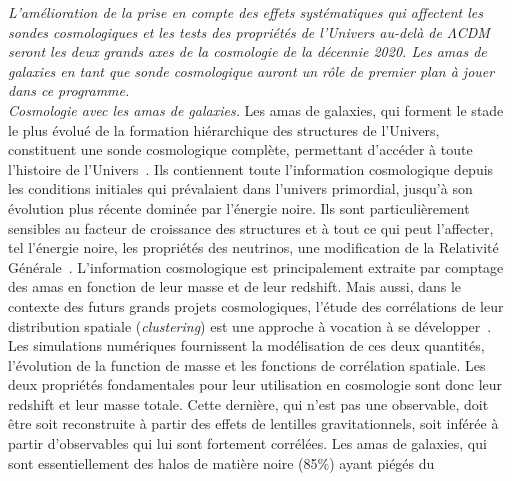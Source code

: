 \emph{L'amélioration de la prise en compte des effets systématiques
qui affectent les sondes cosmologiques et les tests des propriétés de
l'Univers au-delà de $\Lambda$CDM seront les deux grands axes de la
cosmologie de la décennie 2020. Les amas de galaxies en tant que sonde
cosmologique auront un rôle de premier plan à jouer dans ce programme.}\\


\emph{Cosmologie avec les amas de galaxies.}
Les amas de galaxies, qui forment le stade le plus évolué
de la formation hiérarchique des structures de l’Univers, constituent
une sonde cosmologique complète, permettant d’accéder à toute l’histoire de
l’Univers~\citep{Allen2011}. Ils contiennent toute l’information
cosmologique depuis les conditions initiales qui prévalaient dans
l’univers primordial, jusqu'à son évolution plus récente dominée par
l’énergie noire. Ils sont particulièrement sensibles au facteur de
croissance des structures et à tout ce qui peut l’affecter, tel l'énergie
noire, les propriétés des neutrinos, une modification de la Relativité
Générale~\citep{Haiman2001, Wang2005, Bolliet2019, Mohr2003,
Hagstotz2019}.
L’information cosmologique est principalement extraite par comptage
des amas en fonction de leur masse et de leur redshift. Mais aussi,
dans le contexte des futurs grands projets cosmologiques, l’étude des
corrélations de leur distribution spatiale (\emph{clustering}) est une
approche à vocation à se développer~\citep[e.g.][]{Mana2013}. Les
simulations numériques fournissent la modélisation de ces deux
quantités, l'évolution de la function de masse et les fonctions de
corrélation spatiale. Les deux propriétés fondamentales pour leur
utilisation en cosmologie sont donc leur redshift et leur masse
totale. Cette dernière, qui
n'est pas une observable, doit être soit reconstruite à partir des
effets de lentilles gravitationnels, soit inférée à partir
d'observables qui lui sont fortement corrélées. Les amas de galaxies,
qui sont essentiellement des halos de matière noire (85$\%$) ayant piégés du
